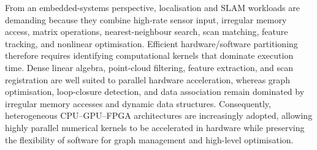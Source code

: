 \documentclass[graybox,envcountchap]{style/SNmono}
\begin{document}
From an embedded-systems perspective, localisation and SLAM workloads are demanding because they combine high-rate sensor input, irregular memory access, matrix operations, nearest-neighbour search, scan matching, feature tracking, and nonlinear optimisation. Efficient hardware/software partitioning therefore requires identifying computational kernels that dominate execution time. Dense linear algebra, point-cloud filtering, feature extraction, and scan registration are well suited to parallel hardware acceleration, whereas graph optimisation, loop-closure detection, and data association remain dominated by irregular memory accesses and dynamic data structures. Consequently, heterogeneous CPU--GPU--FPGA architectures are increasingly adopted, allowing highly parallel numerical kernels to be accelerated in hardware while preserving the flexibility of software for graph management and high-level optimisation.
\end{document}
